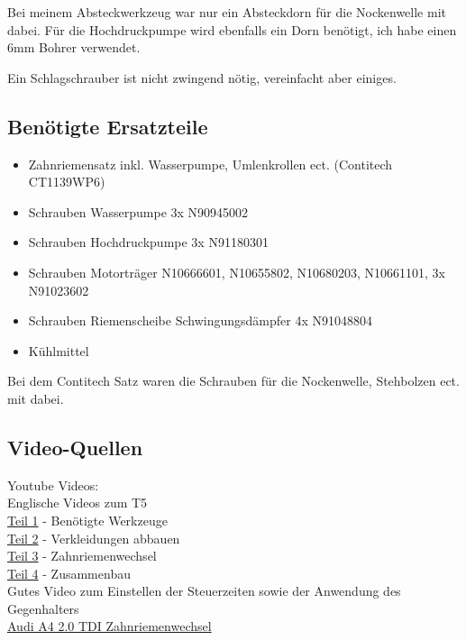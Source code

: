\documentclass[twoside,a4paper]{refart}
\begin{document}
Bei meinem Absteckwerkzeug war nur ein Absteckdorn für die Nockenwelle mit dabei. Für die Hochdruckpumpe wird ebenfalls ein Dorn benötigt, ich habe einen 6mm Bohrer verwendet.

Ein Schlagschrauber ist nicht zwingend nötig, vereinfacht aber einiges.

\subsection{Benötigte Ersatzteile}
\begin{itemize}
	\item Zahnriemensatz inkl. Wasserpumpe, Umlenkrollen ect. (Contitech CT1139WP6)
	\item Schrauben Wasserpumpe 3x N90945002
	\item Schrauben Hochdruckpumpe 3x N91180301
	\item Schrauben Motorträger N10666601, N10655802, N10680203, N10661101, 3x N91023602
	\item Schrauben Riemenscheibe Schwingungsdämpfer 4x N91048804
	\item Kühlmittel
\end{itemize}

Bei dem Contitech Satz waren die Schrauben für die Nockenwelle, Stehbolzen ect. mit dabei.

\subsection{Video-Quellen}
Youtube Videos: \\
Englische Videos zum T5 \\
\href{https://www.youtube.com/watch?v=lM7_e-wfeLw}{Teil 1} - Benötigte Werkzeuge\\
\href{https://www.youtube.com/watch?v=5waO83BzXO8}{Teil 2} - Verkleidungen abbauen\\
\href{https://www.youtube.com/watch?v=JyRyLn6IAqA}{Teil 3} - Zahnriemenwechsel\\
\href{https://www.youtube.com/watch?v=LfvovYmEzTM}{Teil 4} - Zusammenbau\\

Gutes Video zum Einstellen der Steuerzeiten sowie der Anwendung des Gegenhalters\\
\href{https://www.youtube.com/watch?v=io7AP5-M3bM}{Audi A4 2.0 TDI Zahnriemenwechsel}\\
\clearpage
\end{document}
